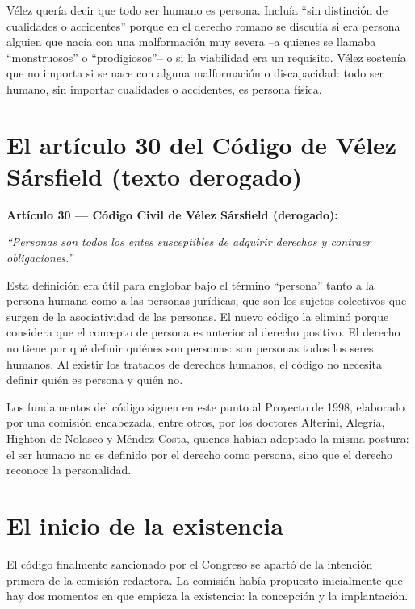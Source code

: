 \documentclass[12pt,oneside]{book}
\begin{document}
Vélez quería decir que todo ser humano es persona. Incluía ``sin distinción de cualidades o accidentes'' porque en el derecho romano se discutía si era persona alguien que nacía con una malformación muy severa --a quienes se llamaba ``monstruosos'' o ``prodigiosos''-- o si la viabilidad era un requisito. Vélez sostenía que no importa si se nace con alguna malformación o discapacidad: todo ser humano, sin importar cualidades o accidentes, es persona física.

\section{El artículo 30 del Código de Vélez Sársfield (texto derogado)}

\begin{note}
\textbf{Artículo 30 --- Código Civil de Vélez Sársfield (derogado):}

\textit{``Personas son todos los entes susceptibles de adquirir derechos y contraer obligaciones.''}
\end{note}

Esta definición era útil para englobar bajo el término ``persona'' tanto a la persona humana como a las personas jurídicas, que son los sujetos colectivos que surgen de la asociatividad de las personas. El nuevo código la eliminó porque considera que el concepto de persona es anterior al derecho positivo. El derecho no tiene por qué definir quiénes son personas: son personas todos los seres humanos. Al existir los tratados de derechos humanos, el código no necesita definir quién es persona y quién no.

Los fundamentos del código siguen en este punto al Proyecto de 1998, elaborado por una comisión encabezada, entre otros, por los doctores Alterini, Alegría, Highton de Nolasco y Méndez Costa, quienes habían adoptado la misma postura: el ser humano no es definido por el derecho como persona, sino que el derecho reconoce la personalidad.

\section{El inicio de la existencia}

El código finalmente sancionado por el Congreso se apartó de la intención primera de la comisión redactora. La comisión había propuesto inicialmente que hay dos momentos en que empieza la existencia: la concepción y la implantación.

\end{document}
